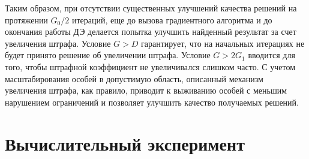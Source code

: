 Таким образом, при отсутствии существенных улучшений качества решений на протяжении $G_0/2$ итераций, еще до
вызова градиентного алгоритма и до окончания работы ДЭ делается попытка улучшить найденный результат за счет увеличения штрафа.
Условие $G > D$ гарантирует, что на начальных итерациях не будет принято решение об увеличении штрафа.
Условие $G > 2 G_1$ вводится для того, чтобы штрафной коэффициент не увеличивался слишком часто.
С учетом масштабирования особей в допустимую область, описанный механизм увеличения штрафа, как правило,
приводит к выживанию особей с меньшим нарушением ограничений и позволяет улучшить качество получаемых решений.

\section{Вычислительный эксперимент}\label{sec:exp:de}

